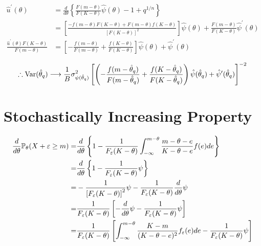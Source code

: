 \begin{align}
    \hat{u}^\prime (\theta)
        &= \frac{d}{d\theta} \left\{ \frac{F(m - \theta)}{F(K - \theta)} \hat\psi(\theta) - 1 + q^{1/n} \right\} \\
        &= \left[ \frac{-f(m - \theta)F(K-\theta) + F(m - \theta)f(K-\theta)}{[F(K - \theta)]^2} \right] \hat\psi(\theta) + \frac{F(m - \theta)}{F(K - \theta)} \hat\psi^\prime(\theta) \\
    \frac{\hat{u}^\prime (\theta) F(K - \theta)}{F(m - \theta)}
        &= \left[ - \frac{f(m - \theta)}{F(m - \theta)} + \frac{f(K - \theta)}{F(K - \theta)} \right] \hat\psi(\theta) + \hat\psi^\prime(\theta)
\end{align}

\begin{equation}
    \therefore \mathrm{Var}(\hat\theta_q) \longrightarrow \frac{1}{B} \sigma^2_{\psi(\hat\theta_q)} \left[ \left( - \frac{f(m - \hat\theta_q)}{F(m - \hat\theta_q)} + \frac{f(K - \hat\theta_q)}{F(K - \hat\theta_q)} \right) \hat\psi(\hat\theta_q) + \hat\psi^\prime(\hat\theta_q) \right]^{-2}
\end{equation}

\clearpage

\section{Stochastically Increasing Property}

\begingroup
\allowdisplaybreaks    
\begin{align}
    \frac{d}{d\theta} \mathbb{P}_\theta (X+\varepsilon \geq m)
        =& \frac{d}{d\theta} \left\{ 1 - \frac{1}{F_\varepsilon (K-\theta) } \int_{-\infty}^{m-\theta} \frac{m - \theta - e }{K - \theta - e} f(e) de \right\} \\
        =& \frac{d}{d\theta} \left\{ 1 - \frac{1}{F_\varepsilon (K-\theta) } \psi \right\} \\
        =& - \frac{1}{\left[ F_\varepsilon (K-\theta) \right]^2 } \psi - \frac{1}{ F_\varepsilon (K-\theta) } \frac{d}{d\theta} \psi \\
        =& \frac{1}{F_\varepsilon (K-\theta)} \left[ -\frac{d}{d\theta} \psi - \frac{1}{ F_\varepsilon (K-\theta) } \psi \right] \\
        =& \frac{1}{ F_\varepsilon (K-\theta) } \left[  \int_{-\infty}^{m-\theta} \frac{K - m }{(K - \theta - e)^2} f_\varepsilon(e) de - \frac{1}{ F_\varepsilon (K-\theta) } \psi \right]
\end{align}

